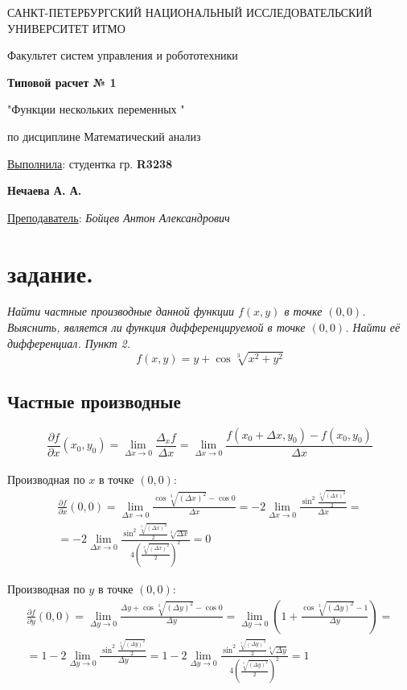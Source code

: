 \documentclass[a5paper, 10pt]{article}
\theoremstyle{definition}
\theoremstyle{plain}
\theoremstyle{remark}
\newcommand*{\titlePage}{
	\thispagestyle{title}
	\begingroup
	\begin{center}
		\vspace*{6ex}
		
		{\small
			САНКТ-ПЕТЕРБУРГСКИЙ НАЦИОНАЛЬНЫЙ ИССЛЕДОВАТЕЛЬСКИЙ УНИВЕРСИТЕТ ИТМО	
		}
		
		\vspace*{2ex}
		
		{\normalsize
			Факультет систем управления и робототехники
		}
		
		\vspace*{15ex}
		
		{\Large \bfseries 
			Типовой расчет № 1
		}
\vspace*{2ex}
	{\Large \bfseries 
			
"Функции нескольких переменных "
		}
\vspace*{2ex}
		
		{\normalsize
			по дисциплине Математический анализ
		}

	\end{center}
	\vspace*{20ex}
	\begin{flushright}
		{\large 
			\underline{Выполнила}: студентка гр. \textbf{R3238}\\
			\begin{flushright}
				\textbf{Нечаева А. А.}\\
			\end{flushright}
		}
		
		\vspace*{5ex}
		
		{\large 
			\underline{Преподаватель}: \textit{Бойцев Антон Александрович}
		}
	\end{flushright}	
	\newpage
	\setcounter{page}{1}
	\endgroup}
\begin{document}
	\titlePage
	\pagestyle{style}
\newpage

\section{задание.}
\textit{Найти частные производные данной функции $f(x, y)$ в точке $(0, 0)$. Выяснить, является ли функция дифференцируемой в точке $(0, 0)$. Найти её дифференциал. Пункт 2.}
\begin{equation}
f(x, y) = y + \cos \sqrt[3]{x^2 + y^2}
\end{equation}
\subsection{Частные производные}

\begin{equation}
\frac{\partial f}{\partial x} (x_0, y_0) = \lim_{\Delta x \to 0} \frac{\Delta_x f}{\Delta x} = \lim_{\Delta x \to 0} \frac{f ( x_0 + \Delta x, y_0) - f(x_0, y_0)}{\Delta x}
\end{equation}
\\

Производная по $x$ в точке $(0, 0)$:
\begin{multline}
\frac{\partial f}{\partial x} (0, 0) = \lim_{\Delta x \to 0} \frac{\cos \sqrt[3]{( \Delta x)^2} - \cos 0}{\Delta x} = 
-2 \lim_{\Delta x \to 0} \frac{\sin^2  \frac{ \sqrt[3]{( \Delta x)^2}}{2}}{\Delta x} =\\
= -2 \lim_{\Delta x \to 0} \frac{\sin^2  \frac{ \sqrt[3]{( \Delta x)^2}}{2} \sqrt[3]{ \Delta x}}{4 \left(\frac{ \sqrt[3]{( \Delta x)^2}}{2} \right)^2} = 0
\end{multline}


Производная по $y$ в точке $(0, 0)$:
\begin{multline}
\frac{\partial f}{\partial y} (0, 0) = \lim_{\Delta y \to 0} \frac{\Delta y + \cos \sqrt[3]{( \Delta y)^2} - \cos 0}{\Delta y} = 
\lim_{\Delta y \to 0} \left(1 +  \frac{\cos \sqrt[3]{( \Delta y)^2} - 1}{\Delta y} \right) =\\
= 1 - 2 \lim_{\Delta y \to 0} \frac{\sin^2  \frac{ \sqrt[3]{( \Delta y)^2}}{2}}{\Delta y} 
=1 -2 \lim_{\Delta y \to 0} \frac{\sin^2  \frac{ \sqrt[3]{( \Delta y)^2}}{2} \sqrt[3]{ \Delta y}}{4 \left(\frac{ \sqrt[3]{( \Delta y)^2}}{2} \right)^2} = 1
\end{multline}
\end{document}
